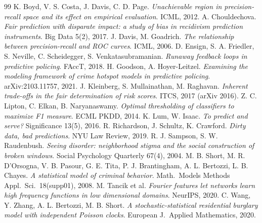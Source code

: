 \documentclass[11pt,a4paper]{article}
\begin{document}
\begin{thebibliography}{99}\small
{} K. Boyd, V. S. Costa, J. Davis, C. D. Page.
\emph{Unachievable region in precision-recall space and its effect on empirical evaluation}. ICML, 2012.
 A. Chouldechova.
\emph{Fair prediction with disparate impact: a study of bias in recidivism prediction instruments}. Big Data 5(2), 2017.
 J. Davis, M. Goadrich.
\emph{The relationship between precision-recall and ROC curves}. ICML, 2006.
 D. Ensign, S. A. Friedler, S. Neville, C. Scheidegger, S. Venkatasubramanian.
\emph{Runaway feedback loops in predictive policing}. FAccT, 2018.
 H. Goodson, A. Hoyer-Leitzel.
\emph{Examining the modeling framework of crime hotspot models in predictive policing}. arXiv:2103.11757, 2021.
 J. Kleinberg, S. Mullainathan, M. Raghavan.
\emph{Inherent trade-offs in the fair determination of risk scores}. ITCS, 2017 (arXiv 2016).
 Z. C. Lipton, C. Elkan, B. Naryanaswamy.
\emph{Optimal thresholding of classifiers to maximize F1 measure}. ECML PKDD, 2014.
 K. Lum, W. Isaac.
\emph{To predict and serve?} Significance 13(5), 2016.
 R. Richardson, J. Schultz, K. Crawford.
\emph{Dirty data, bad predictions}. NYU Law Review, 2019.
 R. J. Sampson, S. W. Raudenbush.
\emph{Seeing disorder: neighborhood stigma and the social construction of broken windows}. Social Psychology Quarterly 67(4), 2004.
 M. B. Short, M. R. D'Orsogna, V. B. Pasour, G. E. Tita, P. J. Brantingham, A. L. Bertozzi, L. B. Chayes.
\emph{A statistical model of criminal behavior}. Math.\ Models Methods Appl.\ Sci.\ 18(supp01), 2008.
 M. Tancik et al.
\emph{Fourier features let networks learn high frequency functions in low dimensional domains}. NeurIPS, 2020.
 C. Wang, Y. Zhang, A. L. Bertozzi, M. B. Short.
\emph{A stochastic-statistical residential burglary model with independent Poisson clocks}. European J.\ Applied Mathematics, 2020.
\end{thebibliography}
\end{document}
